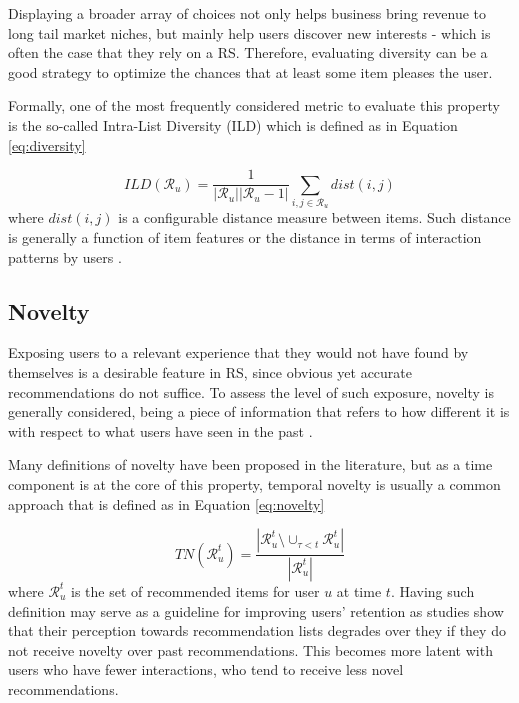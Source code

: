
Displaying a broader array of choices not only helps business bring revenue to long tail market niches, but mainly help users discover new interests - which is often the case that they rely on a RS. Therefore, evaluating diversity can be a good strategy to optimize the chances that at least some item pleases the user.

Formally, one of the most frequently considered metric to evaluate this property is the so-called Intra-List Diversity (ILD)  \cite{2001SimilarityDiversity} which is defined as in Equation \ref{eq:diversity}

\begin{equation}
    \label{eq:diversity}
    ILD (\mathcal{R}_u) = \frac{1}{|\mathcal{R}_u||\mathcal{R}_u-1|} \sum_{i, j \in \mathcal{R}_u} dist(i,j)
\end{equation} where $dist(i,j)$ is a configurable distance measure between items. Such distance is generally a function of item features \cite{10.1145/1060745.1060754} or the distance in terms of interaction patterns by users \cite{2014NoveltyDiversityEnhancement}.


\subsection{Novelty}

Exposing users to a relevant experience that they would not have found by themselves is a desirable feature in RS, since obvious yet accurate recommendations do not suffice. To assess the level of such exposure, novelty is generally considered, being a piece of information that refers to how different it is with respect to what users have seen in the past \cite{2011RankNoveltyDiversity}. 

Many definitions of novelty have been proposed in the literature, but as a time component is at the core of this property, temporal novelty is usually a common approach that is defined as in Equation \ref{eq:novelty}

\begin{equation}
\label{eq:novelty}
    TN(\mathcal{R}^t_u) = \frac{|\mathcal{R}^t_u \setminus \cup_{\tau < t} \mathcal{R}^t_u|}{|\mathcal{R}^t_u|}
\end{equation} where $\mathcal{R}^t_u$ is the set of recommended items for user $u$ at time $t$. Having such definition may serve as a guideline for improving users' retention as studies show that their perception towards recommendation lists degrades over they if they do not receive novelty over past recommendations. This becomes more latent with users who have fewer interactions, who tend to receive less novel recommendations.

